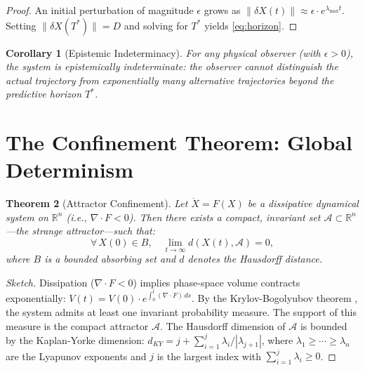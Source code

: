 \documentclass[12pt, a4paper]{article}
\theoremstyle{plain}
\newtheorem{theorem}{Theorem}[section]
\newtheorem{corollary}[theorem]{Corollary}
\theoremstyle{definition}
\theoremstyle{remark}
\newcommand{\R}{\mathbb{R}}
\newcommand{\calA}{\mathcal{A}}
\begin{document}
\begin{proof}
  An initial perturbation of magnitude $\epsilon$ grows as
  $\|\delta X(t)\| \approx \epsilon \cdot e^{\lambda_{\max} t}$.
  Setting $\|\delta X(T^*)\| = D$ and solving for $T^*$ yields
  \eqref{eq:horizon}. \qedhere
\end{proof}

\begin{corollary}[Epistemic Indeterminacy]\label{cor:epistemic}
  For any physical observer (with $\epsilon > 0$), the system is
  \emph{epistemically indeterminate}: the observer cannot distinguish
  the actual trajectory from exponentially many alternative trajectories
  beyond the predictive horizon $T^*$.
\end{corollary}

\section{The Confinement Theorem: Global Determinism}\label{sec:confinement}

\begin{theorem}[Attractor Confinement]\label{thm:confinement}
  Let $\dot{X} = F(X)$ be a dissipative dynamical system on $\R^n$
  (i.e., $\nabla \cdot F < 0$). Then there exists a compact, invariant
  set $\calA \subset \R^n$---the \emph{strange attractor}---such that:
  \begin{equation}
    \forall\, X(0) \in B, \quad
    \lim_{t \to \infty} d(X(t), \calA) = 0,
  \end{equation}
  where $B$ is a bounded absorbing set and $d$ denotes the Hausdorff
  distance.
\end{theorem}

\begin{proof}[Sketch]
  Dissipation ($\nabla \cdot F < 0$) implies phase-space volume contracts
  exponentially: $V(t) = V(0) \cdot e^{\int_0^t (\nabla \cdot F)\, ds}$.
  By the Krylov-Bogolyubov theorem \citep{Krylov1937}, the system admits
  at least one invariant probability measure. The support of this measure
  is the compact attractor $\calA$. The Hausdorff dimension of $\calA$ is
  bounded by the Kaplan-Yorke dimension:
  $d_{KY} = j + \sum_{i=1}^{j} \lambda_i / |\lambda_{j+1}|$,
  where $\lambda_1 \geq \cdots \geq \lambda_n$ are the Lyapunov exponents
  and $j$ is the largest index with $\sum_{i=1}^j \lambda_i \geq 0$.
  \qedhere
\end{proof}
\end{document}
